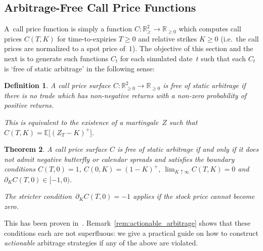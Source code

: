 \documentclass[11pt,a4paper]{article}
\newtheorem{definition}{Definition}[section]
\newtheorem{theorem}[definition]{Theorem}
\newcommand{\R}{\mathbb{R}}
\newcommand{\E}{\mathbb{E}}
\begin{document}
\subsection{Arbitrage-Free Call Price Functions}

A~call price function is simply a function $C:\R^2_{\geq} \longrightarrow  \R_{\geq 0}$
which computes call prices $C(T,K)$ for time-to-expiries $T\geq 0$ and relative
strikes $K\geq 0$ (i.e.~the call prices are normalized to a spot price of~$1$).
The objective of this section and the next is to generate such functions $C_t$ for each
simulated date~$t$ such that each $C_t$ is `free of static arbitrage' in the following sense:

\begin{definition}
A call price surface $C: \R^2_{\geq 0}\to \R_{\geq 0}$ is \emph{free of static arbitrage} if there is no trade
which has non-negative returns with a non-zero probability of
positive returns.

This is equivalent to the existence of a
martingale~$Z$ such that $C(T,K)= \E\big[(Z_{T}-K)^+\big]$.
\end{definition}

\begin{theorem}\label{th:arbfree}
A call price surface $C$ is free of static arbitrage if and only if
it does not admit negative butterfly or calendar
spreads and satisfies the boundary conditions
$C(T,0)=1$, $C(0,K)=(1-K)^+$, $\lim_{K\uparrow\infty} C(T,K)=0$ and $\partial_K C(T,0)\in[-1,0)$.

The stricter condition~$\partial_K C(T,0)=-1$ applies if the stock price cannot become zero.
\end{theorem}

This has been proven in~\citet{buehler2006expensive}. Remark~\ref{rem:actionable_arbitrage}
shows that these conditions each are not superfluous: we give a practical
guide on how to construct \emph{actionable} arbitrage strategies if any of the above
are violated.
\end{document}
